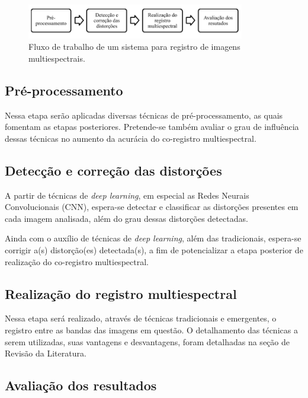 \documentclass[12pt]{article}
\begin{document}
\begin{figure}[!ht]
    \centering
    \includegraphics[width=0.85\textwidth]{figures/metodologia.png}
    \caption{Fluxo de trabalho de um sistema para registro de imagens multiespectrais.}
    \label{fig:metodologia}
\end{figure}



\subsection{Pré-processamento} 

Nessa etapa serão aplicadas diversas técnicas de pré-processamento, as quais fomentam as etapas posteriores. Pretende-se também avaliar o grau de influência dessas técnicas no aumento da acurácia do co-registro multiespectral.

\subsection{Detecção e correção das distorções}

A partir de técnicas de \textit{deep learning}, em especial as Redes Neurais Convolucionais (CNN), espera-se detectar e classificar as distorções presentes em cada imagem analisada, além do grau dessas distorções detectadas.

Ainda com o auxílio de técnicas de \textit{deep learning}, além das tradicionais, espera-se corrigir a(s) distorção(es) detectada(s), a fim de potencializar a etapa posterior de realização do co-registro multiespectral.

\subsection{Realização do registro multiespectral}

Nessa etapa será realizado, através de técnicas tradicionais e emergentes, o registro entre as bandas das imagens em questão. O detalhamento das técnicas a serem utilizadas, suas vantagens e desvantagens, foram detalhadas na seção de Revisão da Literatura.

\subsection{Avaliação dos resultados}
\end{document}
